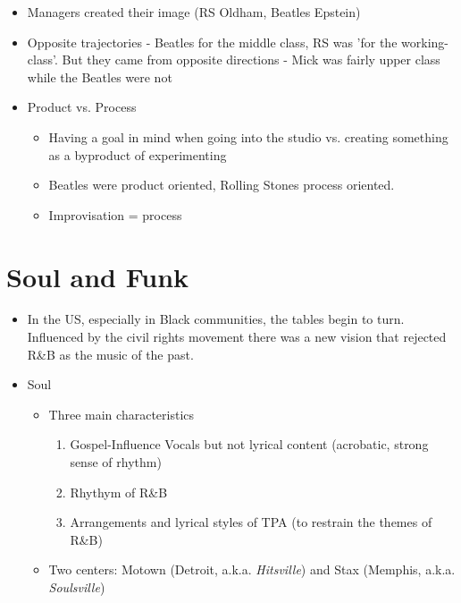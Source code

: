 \documentclass[11pt]{report}
\newcommand{\bl}{\begin{itemize}}
\newcommand{\kl}{\end{itemize}}
\begin{document}
\begin{itemize}
	\bl
		\item Managers created their image (RS Oldham, Beatles Epstein)
		\item Opposite trajectories - Beatles for the middle class, RS was 'for the working-class'. But they came from opposite directions - Mick was fairly upper class while the Beatles were not
		\item Product vs. Process
		\bl
			\item Having a goal in mind when going into the studio vs. creating something as a byproduct of experimenting
			\item Beatles were product oriented, Rolling Stones process oriented.
			\item Improvisation = process
		\kl
	\kl
\end{itemize}

\chapter{Soul and Funk}

\begin{itemize}
	\item In the US, especially in Black communities, the tables begin to turn. Influenced by the civil rights movement there was a new vision that rejected R\&B as the music of the past.
	\item Soul
	\bl
		\item Three main characteristics
		\begin{enumerate}
			\item Gospel-Influence Vocals but not lyrical content (acrobatic, strong sense of rhythm)
			\item Rhythym of R\&B
			\item Arrangements and lyrical styles of TPA (to restrain the themes of R\&B)
		\end{enumerate}
		\item Two centers: Motown (Detroit, a.k.a. \textit{Hitsville}) and Stax (Memphis, a.k.a. \textit{Soulsville})
	\kl
\end{itemize}
\end{document}
